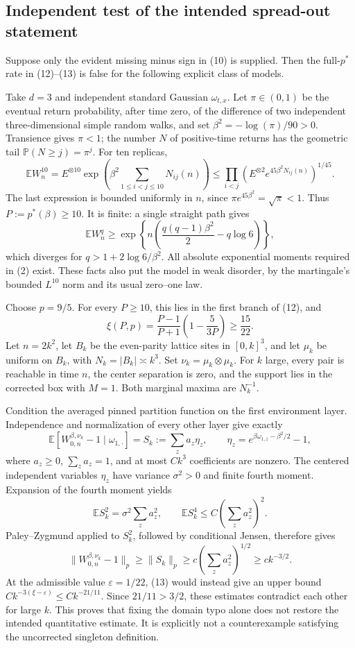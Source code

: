\documentclass[10pt]{article}
\begin{document}
\subsection*{Independent test of the intended spread-out statement}
Suppose only the evident missing minus sign in (10) is supplied. Then the full-\(p^*\) rate in (12)–(13) is false for the following explicit class of models.\par
Take \(d=3\) and independent standard Gaussian \(\omega_{t,x}\). Let \(\pi\in(0,1)\) be the eventual return probability, after time zero, of the difference of two independent three-dimensional simple random walks, and set \(\beta^2=-\log(\pi)/90>0\). Transience gives \(\pi<1\); the number \(N\) of positive-time returns has the geometric tail \(\mathbb P(N\geq j)=\pi^j\). For ten replicas, \[\mathbb EW_n^{10}
 =E^{\otimes10}\exp\!\left(\beta^2
       \sum_{1\leq i<j\leq10}N_{ij}(n)\right)
 \leq \prod_{i<j}
       \left(E^{\otimes2}e^{45\beta^2N_{ij}(n)}\right)^{1/45}.\] The last expression is bounded uniformly in \(n\), since \(\pi e^{45\beta^2}=\sqrt\pi<1\). Thus \(P:=p^*(\beta)\geq10\). It is finite: a single straight path gives \[\mathbb EW_n^q\geq
 \exp\!\left\{n\left(\frac{q(q-1)\beta^2}{2}-q\log6\right)\right\},\] which diverges for \(q>1+2\log6/\beta^2\). All absolute exponential moments required in (2) exist. These facts also put the model in weak disorder, by the martingale’s bounded \(L^{10}\) norm and its usual zero–one law.\par
Choose \(p=9/5\). For every \(P\geq10\), this lies in the first branch of (12), and \[\xi(P,p)=\frac{P-1}{P+1}\left(1-\frac{5}{3P}\right)
 \geq\frac{15}{22}.\] Let \(n=2k^2\), let \(B_k\) be the even-parity lattice sites in \([0,k]^3\), and let \(\mu_k\) be uniform on \(B_k\), with \(N_k=|B_k|\asymp k^3\). Set \(\nu_k=\mu_k\otimes\mu_k\). For \(k\) large, every pair is reachable in time \(n\), the center separation is zero, and the support lies in the corrected box with \(M=1\). Both marginal maxima are \(N_k^{-1}\).\par
Condition the averaged pinned partition function on the first environment layer. Independence and normalization of every other layer give exactly \[\mathbb E[W_{0,n}^{\beta,\nu_k}-1\mid\omega_{1,\cdot}]
   =S_k:=\sum_z a_z\eta_z,\qquad
 \eta_z=e^{\beta\omega_{1,z}-\beta^2/2}-1,\] where \(a_z\geq0\), \(\sum_z a_z=1\), and at most \(Ck^3\) coefficients are nonzero. The centered independent variables \(\eta_z\) have variance \(\sigma^2>0\) and finite fourth moment. Expansion of the fourth moment yields \[\mathbb ES_k^2=\sigma^2\sum_z a_z^2,\qquad
 \mathbb ES_k^4\leq C\left(\sum_z a_z^2\right)^2.\] Paley–Zygmund applied to \(S_k^2\), followed by conditional Jensen, therefore gives \[\|W_{0,n}^{\beta,\nu_k}-1\|_p
 \geq \|S_k\|_p
 \geq c\left(\sum_z a_z^2\right)^{1/2}
 \geq c k^{-3/2}.\] At the admissible value \(\varepsilon=1/22\), (13) would instead give an upper bound \(C k^{-3(\xi-\varepsilon)}\leq Ck^{-21/11}\). Since \(21/11>3/2\), these estimates contradict each other for large \(k\). This proves that fixing the domain typo alone does not restore the intended quantitative estimate. It is explicitly not a counterexample satisfying the uncorrected singleton definition.\par
\end{document}
